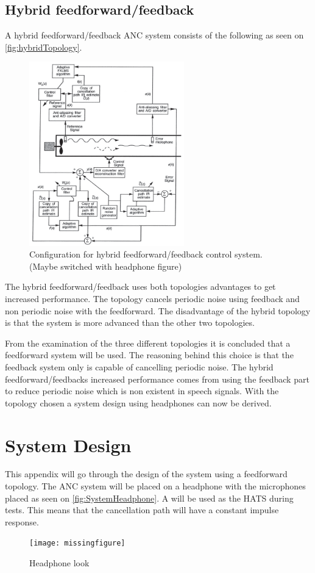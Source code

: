 \subsection*{Hybrid feedforward/feedback}    
A hybrid feedforward/feedback ANC system consists of the following as seen on \autoref{fig:hybridTopology}.
\begin{figure}[H]
	\centering
	\includegraphics[width=0.6\textwidth]{figures/BasicSystem/hybrid}
	\caption{Configuration for hybrid feedforward/feedback control system. (Maybe switched with headphone figure)}
	\label{fig:hybridTopology}
\end{figure}

The hybrid feedforward/feedback uses both topologies advantages to get increased performance. The topology cancels periodic noise using feedback and non periodic noise with the feedforward. The disadvantage of the hybrid topology is that the system is more advanced than the other two topologies.   

From the examination of the three different topologies it is concluded that a feedforward system will be used. The reasoning behind this choice is that the feedback system only is capable of cancelling periodic noise. The hybrid feedforward/feedbacks increased performance comes from using the feedback part to reduce periodic noise which is non existent in speech signals. With the topology chosen a system design using headphones can now be derived. 



\newpage 
\section{System Design} \label{sec:systemDesign}
This appendix will go through the design of the system using a feedforward topology. The ANC system will be placed on a headphone with the microphones placed as seen on \autoref{fig:SystemHeadphone}. A  will be used as the HATS during tests. This means that the cancellation path will have a constant impulse response. 
\begin{figure}[H]
	\centering
	\texttt{[image: missingfigure]}
	\caption{Headphone look}
	\label{fig:SystemHeadphone}
\end{figure}  

